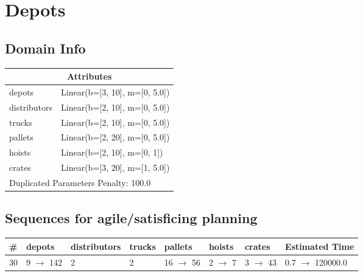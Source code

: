 \documentclass{article}
\begin{document}
                            \newpage \section{Depots}
                    \subsection*{Domain Info}

                    \begin{center}
                    \begin{tabular}{@{}p{}p{}@{}}
                    \multicolumn{2}{c}{\bf \large Attributes}\\\midrule
                    depots & Linear(b=[3, 10], m=[0, 5.0])\\
distributors & Linear(b=[2, 10], m=[0, 5.0])\\
trucks & Linear(b=[2, 10], m=[0, 5.0])\\
pallets & Linear(b=[2, 20], m=[0, 5.0])\\
hoists & Linear(b=[2, 10], m=[0, 1])\\
crates & Linear(b=[3, 20], m=[1, 5.0])
                    
                     \\\midrule
                    \multicolumn{2}{l}{Duplicated Parameters Penalty: 100.0}
                    \end{tabular}
                    \end{center}
                
                         \subsection*{Sequences for agile/satisficing planning}

                        \begin{center}
                        \begin{tabular}{@{}l|l|l|l|l|l|l|l@{}}
                        \# & depots & distributors & trucks & pallets & hoists & crates & Estimated Time\\\midrule
                        30&9 $\rightarrow$ 142&2&2&16 $\rightarrow$ 56&2 $\rightarrow$ 7&3 $\rightarrow$ 43&0.7 $\rightarrow$ 120000.0
                        \end{tabular}
                        \end{center}
                    
\end{document}
